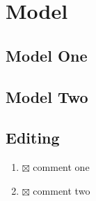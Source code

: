 \section{Model}

\subsection{Model One}


\subsection{Model Two}


\subsection{Editing}
\begin{enumerate}
  \item $\boxtimes$ comment one
  \item $\boxtimes$ comment two
\end{enumerate}
